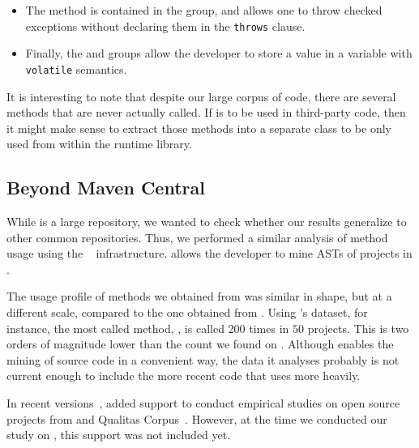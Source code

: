 \begin{itemize}
\item The  method is contained in the  group, and allows one to throw checked exceptions without declaring them in the \texttt{throws} clause.

\item Finally, the  and  groups allow the developer to store a value in a \java{} variable with \texttt{volatile} semantics.

\end{itemize}

It is interesting to note that despite our large corpus of code,
there are several \unsafe{} methods that are never actually called.
If \unsafe{} is to be used in third-party code,
then it might make sense to extract those methods into a separate class to be only used from within the runtime library.

\subsection*{Beyond Maven Central}

While \mavencentral{} is a large repository,
we wanted to check whether our results generalize to other common repositories.
Thus, we performed a similar analysis of method usage using the \boa{}~\cite{dyerBoaLanguageInfrastructure2013,dyerMiningSourceCode2013} infrastructure.
\boa{} allows the developer to mine ASTs of \java{} projects in \sourceforge{}.

The usage profile of \unsafe{} methods we obtained from \boa{} was similar in shape,
but at a different scale, compared to the one obtained from \mavencentral{}.
Using \boa{}'s \sourceforge{} dataset, for instance,
the most called method, , 
is called 200 times in $50$ projects.
This is two orders of magnitude lower than the count we found on \mavencentral{}.
Although \boa{} enables the mining of source code in a convenient way, 
the \code{} data it analyses probably is not current enough to include the more recent \java{} code that uses \smu{} more heavily.

In recent versions~\citep{boa-github},
\boa{} added support to conduct empirical studies on open source projects from \github{} and Qualitas Corpus~\citep{temperoQualitasCorpusCurated2010}.
However, at the time we conducted our study on \unsafe{},
this support was not included yet.
